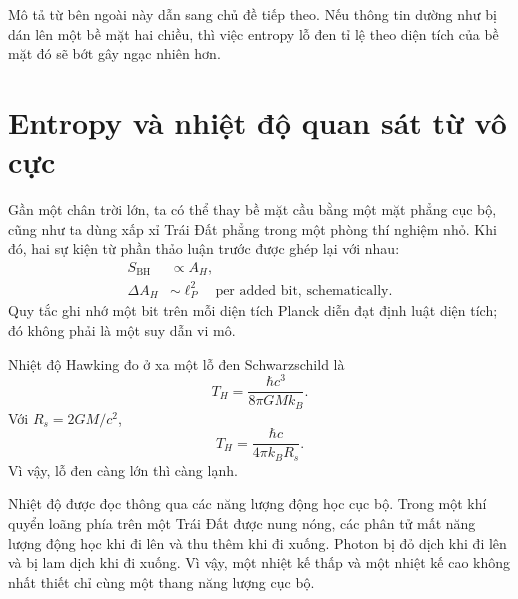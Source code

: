 Mô tả từ bên ngoài này dẫn sang chủ đề tiếp theo. Nếu thông tin dường như bị dán lên một bề mặt hai chiều, thì việc entropy lỗ đen tỉ lệ theo diện tích của bề mặt đó sẽ bớt gây ngạc nhiên hơn.

\section{Entropy và nhiệt độ quan sát từ vô cực}

Gần một chân trời lớn, ta có thể thay bề mặt cầu bằng một mặt phẳng cục bộ, cũng như ta dùng xấp xỉ Trái Đất phẳng trong một phòng thí nghiệm nhỏ. Khi đó, hai sự kiện từ phần thảo luận trước được ghép lại với nhau:
\begin{equation}
\begin{aligned}
S_{\mathrm{BH}}&\propto A_H,\\
\Delta A_H&\sim \ell_P^2
\quad\text{per added bit, schematically}.
\end{aligned}
\end{equation}
Quy tắc ghi nhớ một bit trên mỗi diện tích Planck diễn đạt định luật diện tích; đó không phải là một suy dẫn vi mô.

Nhiệt độ Hawking đo ở xa một lỗ đen Schwarzschild là
\begin{equation}
T_H=\frac{\hbar c^3}{8\pi GMk_B}.
\label{eq:l05-hawking}
\end{equation}
Với \(R_s=2GM/c^2\),
\begin{equation}
T_H=\frac{\hbar c}{4\pi k_B R_s}.
\label{eq:l05-hawking-radius}
\end{equation}
Vì vậy, lỗ đen càng lớn thì càng lạnh.

\begin{classroomqa}
\end{classroomqa}

Nhiệt độ được đọc thông qua các năng lượng động học cục bộ. Trong một khí quyển loãng phía trên một Trái Đất được nung nóng, các phân tử mất năng lượng động học khi đi lên và thu thêm khi đi xuống. Photon bị đỏ dịch khi đi lên và bị lam dịch khi đi xuống. Vì vậy, một nhiệt kế thấp và một nhiệt kế cao không nhất thiết chỉ cùng một thang năng lượng cục bộ.

